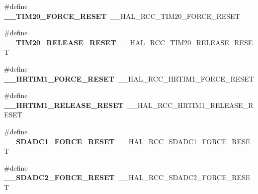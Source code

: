\begin{DoxyCompactItemize}
\item 
\#define {\bfseries \+\_\+\+\_\+\+T\+I\+M20\+\_\+\+F\+O\+R\+C\+E\+\_\+\+R\+E\+S\+ET}~\+\_\+\+\_\+\+H\+A\+L\+\_\+\+R\+C\+C\+\_\+\+T\+I\+M20\+\_\+\+F\+O\+R\+C\+E\+\_\+\+R\+E\+S\+ET\hypertarget{group___h_a_l___r_c_c___aliased_gab06074cd313cdabefa42d60b6480abc1}{}\label{group___h_a_l___r_c_c___aliased_gab06074cd313cdabefa42d60b6480abc1}

\item 
\#define {\bfseries \+\_\+\+\_\+\+T\+I\+M20\+\_\+\+R\+E\+L\+E\+A\+S\+E\+\_\+\+R\+E\+S\+ET}~\+\_\+\+\_\+\+H\+A\+L\+\_\+\+R\+C\+C\+\_\+\+T\+I\+M20\+\_\+\+R\+E\+L\+E\+A\+S\+E\+\_\+\+R\+E\+S\+ET\hypertarget{group___h_a_l___r_c_c___aliased_gabc15a945f5f92e4dff05caf959715131}{}\label{group___h_a_l___r_c_c___aliased_gabc15a945f5f92e4dff05caf959715131}

\item 
\#define {\bfseries \+\_\+\+\_\+\+H\+R\+T\+I\+M1\+\_\+\+F\+O\+R\+C\+E\+\_\+\+R\+E\+S\+ET}~\+\_\+\+\_\+\+H\+A\+L\+\_\+\+R\+C\+C\+\_\+\+H\+R\+T\+I\+M1\+\_\+\+F\+O\+R\+C\+E\+\_\+\+R\+E\+S\+ET\hypertarget{group___h_a_l___r_c_c___aliased_ga0ae3e0425993ce111901795d509024d6}{}\label{group___h_a_l___r_c_c___aliased_ga0ae3e0425993ce111901795d509024d6}

\item 
\#define {\bfseries \+\_\+\+\_\+\+H\+R\+T\+I\+M1\+\_\+\+R\+E\+L\+E\+A\+S\+E\+\_\+\+R\+E\+S\+ET}~\+\_\+\+\_\+\+H\+A\+L\+\_\+\+R\+C\+C\+\_\+\+H\+R\+T\+I\+M1\+\_\+\+R\+E\+L\+E\+A\+S\+E\+\_\+\+R\+E\+S\+ET\hypertarget{group___h_a_l___r_c_c___aliased_ga94826174a601c902e37f88bcee03059a}{}\label{group___h_a_l___r_c_c___aliased_ga94826174a601c902e37f88bcee03059a}

\item 
\#define {\bfseries \+\_\+\+\_\+\+S\+D\+A\+D\+C1\+\_\+\+F\+O\+R\+C\+E\+\_\+\+R\+E\+S\+ET}~\+\_\+\+\_\+\+H\+A\+L\+\_\+\+R\+C\+C\+\_\+\+S\+D\+A\+D\+C1\+\_\+\+F\+O\+R\+C\+E\+\_\+\+R\+E\+S\+ET\hypertarget{group___h_a_l___r_c_c___aliased_ga4772f1a0159530556eafe5771e89396b}{}\label{group___h_a_l___r_c_c___aliased_ga4772f1a0159530556eafe5771e89396b}

\item 
\#define {\bfseries \+\_\+\+\_\+\+S\+D\+A\+D\+C2\+\_\+\+F\+O\+R\+C\+E\+\_\+\+R\+E\+S\+ET}~\+\_\+\+\_\+\+H\+A\+L\+\_\+\+R\+C\+C\+\_\+\+S\+D\+A\+D\+C2\+\_\+\+F\+O\+R\+C\+E\+\_\+\+R\+E\+S\+ET\hypertarget{group___h_a_l___r_c_c___aliased_ga8ac8bc6474aee01e71d62b035fbf6126}{}\label{group___h_a_l___r_c_c___aliased_ga8ac8bc6474aee01e71d62b035fbf6126}


\end{DoxyCompactItemize}
